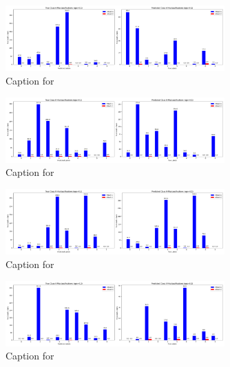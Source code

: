\documentclass{article}
\begin{document}
\begin{figure}[!htbp]
\centering
\includegraphics[width=0.75\textwidth]{combined_class_boundary_pgd/combined_class_6_misclassifications_eps_0.1.png}
\caption{Caption for }
\label{fig:combined_class_6_misclassifications_eps_0.1.png}
\end{figure}

\begin{figure}[!htbp]
\centering
\includegraphics[width=0.75\textwidth]{combined_class_boundary_pgd/combined_class_8_misclassifications_eps_0.1.png}
\caption{Caption for }
\label{fig:combined_class_8_misclassifications_eps_0.1.png}
\end{figure}

\begin{figure}[!htbp]
\centering
\includegraphics[width=0.75\textwidth]{combined_class_boundary_pgd/combined_class_9_misclassifications_eps_0.1.png}
\caption{Caption for }
\label{fig:combined_class_9_misclassifications_eps_0.1.png}
\end{figure}

\begin{figure}[!htbp]
\centering
\includegraphics[width=0.75\textwidth]{combined_class_boundary_pgd/combined_class_0_misclassifications_eps_0.2.png}
\caption{Caption for }
\label{fig:combined_class_0_misclassifications_eps_0.2.png}
\end{figure}
\end{document}

